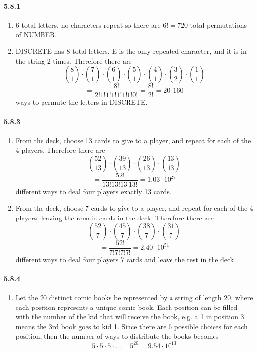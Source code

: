 \documentclass[11pt, letterpaper, twocolumn, fleqn]{article}
\begin{document}
\paragraph{5.8.1}
\begin{enumerate}
  \item 6 total letters, no characters repeat so there are $6! = 720$ total permutations of NUMBER.
  \item DISCRETE has 8 total letters. E is the only repeated character, and it is in the string 2 times. Therefore there are 
    $$\binom{8}{1}\cdot\binom{7}{1}\cdot\binom{6}{1}\cdot\binom{5}{1}\cdot\binom{4}{1} \cdot \binom{3}{2}\cdot\binom{1}{1} $$
    $$= \frac{8!}{2!1!1!1!1!1!1!0!} = \frac{8!}{2!} = 20,160$$
  ways to permute the letters in DISCRETE.
\end{enumerate}

\paragraph{5.8.3}
\begin{enumerate}
  \item From the deck, choose 13 cards to give to a player, and repeat for each of the 4 players. Therefore there are 
    $$\binom{52}{13} \cdot \binom{39}{13} \cdot \binom{26}{13} \cdot \binom{13}{13}$$
    $$= \frac{52!}{13!13!13!13!} = 1.03\cdot10^{27}$$
  different ways to deal four players exactly 13 cards.
  \item From the deck, choose 7 cards to give to a player, and repeat for each of the 4 players, leaving the remain cards in the deck. Therefore there are 
    $$\binom{52}{7} \cdot \binom{45}{7} \cdot \binom{38}{7} \cdot \binom{31}{7}$$
    $$= \frac{52!}{7!7!7!7!} = 2.40\cdot10^{51} $$
  different ways to deal four players 7 cards and leave the rest in the deck.
\end{enumerate}

\paragraph{5.8.4}
\begin{enumerate}
  \item Let the 20 distinct comic books be represented by a string of length 20, where each position represents a unique comic book. Each position can be filled with the number of the kid that will receive the book, e.g. a 1 in position 3 means the 3rd book goes to kid 1. Since there are 5 possible choices for each position, then the number of ways to distribute the books becomes
    $$5 \cdot 5 \cdot 5 \cdot ... = 5^{20} = 9.54\cdot10^{13}$$
\end{enumerate}
\end{document}
